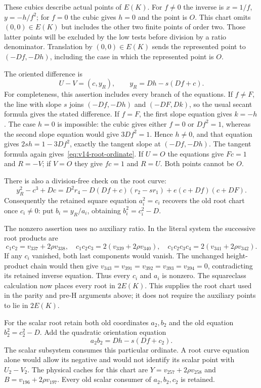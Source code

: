 These cubics describe actual points of $E(K)$. For $f\ne0$ the
inverse is $x=1/f$, $y=-h/f^2$; for $f=0$ the cubic gives $h=0$
and the point is $O$. This chart omits $(0,0)\in E(K)$ but includes
the other two finite points of order two. Those latter points will
be excluded by the low tests before division by a ratio denominator.
Translation by $(0,0)\in E(K)$ sends the represented point to
$(-Df,-Dh)$, including the case in which the represented point
is $O$.

The oriented difference is
\begin{equation}\label{eq:v14-root-ordinate}
 U-V=(c,y_R),\qquad y_R=Dh-s(Df+c).
\end{equation}
For completeness, this assertion includes every branch of the
equations. If $f\ne F$, the line with slope $s$ joins
$(-Df,-Dh)$ and $(-DF,Dk)$, so the usual secant formula gives
the stated difference. If $f=F$, the first slope equation gives
$k=-h$. The case $h=0$ is impossible: the cubic gives either
$f=0$ or $Df^2=1$, whereas the second slope equation would give
$3Df^2=1$. Hence $h\ne0$, and that equation gives
$2sh=1-3Df^2$, exactly the tangent slope at $(-Df,-Dh)$.
The tangent formula again gives~\eqref{eq:v14-root-ordinate}.
If $U=O$ the equations give $Fc=1$ and $R=-V$; if $V=O$ they
give $fc=1$ and $R=U$. Both points cannot be $O$.

There is also a division-free check on the root curve:
\begin{equation}\label{eq:v14-root-identity}
 y_R^2-c^3+Dc
 =D^2r_4-D(Df+c)(r_2-sr_1)
       +e(c+Df)(c+DF).
\end{equation}
Consequently the retained square equation $a_i^2=c_i$ recovers
the old root chart once $c_i\ne0$: put $b_i=y_R/a_i$, obtaining
$b_i^2=c_i^2-D$.

The nonzero assertion uses no auxiliary ratio. In the literal
system the successive root products are
\[
 c_1c_2=v_{337}+2\rho v_{338},\quad
 c_1c_2c_3=2(v_{339}+2\rho v_{340}),\quad
 c_1c_2c_3c_4=2(v_{341}+2\rho v_{342}).
\]
If any $c_i$ vanished, both last components would vanish.
The unchanged height-product chain would then give
$v_{343}=v_{391}=v_{392}=v_{393}=v_{394}=0$, contradicting its
retained inverse equation. Thus every $c_i$ and $a_i$ is nonzero.
The squareclass calculation now places every root in $2E(K)$.
This supplies the root chart used in the parity and pre-H
arguments above; it does not require the auxiliary points to
lie in $2E(K)$.

For the scalar root retain both old coordinates $a_2,b_2$ and
the old equation $b_2^2=c_2^2-D$. Add the quadratic orientation
equation
\begin{equation}\label{eq:v14-S-orientation}
 a_2b_2=Dh-s(Df+c_2).
\end{equation}
The scalar subsystem consumes this particular ordinate. A root
curve equation alone would allow its negative and would not
identify its scalar point with $U_2-V_2$.
The physical caches for this chart are
$Y=v_{257}+2\rho v_{258}$ and $B=v_{196}+2\rho v_{197}$.
Every old scalar consumer of $a_2,b_2,c_2$ is retained.

